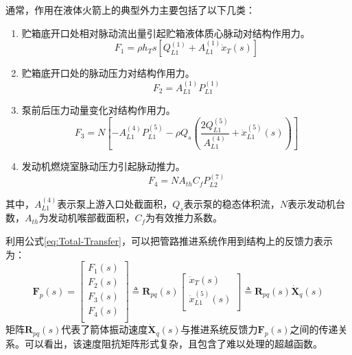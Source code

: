 通常，作用在液体火箭上的典型外力主要包括了以下几类：\label{Page:Typical-Feedback-Force}
\begin{enumerate}[leftmargin=\parindent, align=parleft, labelindent=0pt, labelwidth=*]
\item 贮箱底开口处相对脉动流出量引起贮箱液体质心脉动对结构作用力。
\begin{equation}
	F_1=\rho h_Ts \left[ Q_{L1}^{(1)}+ A_{L1}^{(1)}\dot{x}_T(s) \right]
\end{equation}
\item 贮箱底开口处的脉动压力对结构作用力。
\begin{equation}
	F_2=A_{L1}^{(1)}P_{L1}^{(1)}
\end{equation}
\item 泵前后压力动量变化对结构作用力。
\begin{equation}
	F_3=N\left[ -A_{L1}^{(4)}P_{L1}^{(5)}- \rho Q_s \left( \frac{2Q_{L1}^{(5)}}{A_{L1}^{(4)}}+ \dot{x}_{L1}^{(5)}(s) \right)\right]
\end{equation}
\item 发动机燃烧室脉动压力引起脉动推力。
\begin{equation}
	F_4=NA_{th}C_f P_{L2}^{(7)}
\end{equation}
\end{enumerate}
其中，$A_{L1}^{(4)}$表示泵上游入口处截面积，$Q_s$表示泵的稳态体积流，$N$表示发动机台数，$A_{th}$为发动机喉部截面积，$C_f$为有效推力系数。

利用公式\eqref{eq:Total-Transfer}，可以把管路推进系统作用到结构上的反馈力表示为：
\begin{equation}
	\label{eq:Feedback-Force-Transfer}
	\boldsymbol{F}_p(s)=\left[ \begin{matrix}
	   F_1(s)  \\
	   F_2(s)  \\
	   F_3(s)  \\
	   F_4(s)  \\
	\end{matrix} \right]  \triangleq \boldsymbol{R}_{pq}(s)\left[ \begin{matrix}
	   \dot{x}_T(s)  \\
	   \dot{x}_{L1}^{(5)}(s)  \\
	\end{matrix} \right] \triangleq \boldsymbol{R}_{pq}(s)\boldsymbol{\dot{X}}_q(s)
\end{equation}
矩阵$\boldsymbol{R}_{pq}(s)$代表了箭体振动速度$\boldsymbol{\dot{X}}_q(s)$与推进系统反馈力$\boldsymbol{F}_p(s)$之间的传递关系。可以看出，该速度阻抗矩阵形式复杂，且包含了难以处理的超越函数。

